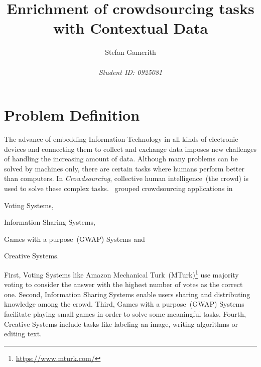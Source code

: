 \documentclass[12pt, notitlepage]{article}
\title{Enrichment of crowdsourcing tasks with Contextual Data}
\author{Stefan Gamerith\\\\
		\emph{Student ID: 0925081}}
\begin{document}
	\maketitle
	\thispagestyle{empty}
	\newpage
\setcounter{page}{1}

\section{Problem Definition}
The advance of embedding Information Technology in all kinds of electronic devices and connecting them to collect and exchange data imposes new challenges of handling the increasing amount of data. Although many problems can be solved by machines only, there are certain tasks where humans perform better than computers. In \emph{Crowdsourcing}, collective human intelligence~(the crowd) is used to solve these complex tasks. \citet{yuen2011survey}~grouped crowdsourcing applications in 
\begin{inparaenum}[1)]
		\item Voting Systems,
		\item Information Sharing Systems,
		\item Games with a purpose~(GWAP) Systems and
		\item Creative Systems.
\end{inparaenum} 
First, Voting Systems like Amazon Mechanical Turk~(MTurk)\footnote{\url{https://www.mturk.com/}} use majority voting to consider the answer with the highest number of votes as the correct one. Second, Information Sharing Systems enable users sharing and distributing knowledge among the crowd. Third, Games with a purpose~(GWAP) Systems facilitate playing small games in order to solve some meaningful tasks. Fourth, Creative Systems include tasks like labeling an image, writing algorithms or editing text. 
\end{document}
